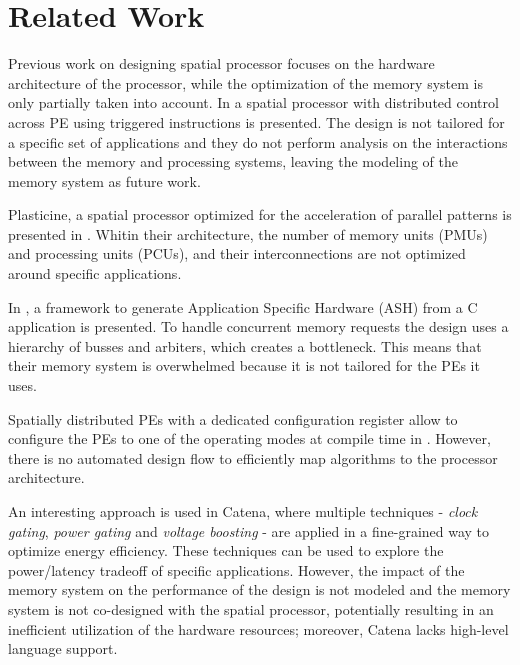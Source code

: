 
\section{Related Work}

Previous work on designing spatial processor focuses on the hardware architecture of the processor, while the optimization of the memory system is only partially taken into account.
In \cite{parashar2014efficient} a spatial processor with distributed control across PE using triggered instructions is presented. The design is not tailored for a specific set of applications and they do not perform analysis on the interactions between the memory and processing systems, leaving the modeling of the memory system as future work.

Plasticine, a spatial processor optimized for the acceleration of parallel patterns is presented in \cite{prabhakar2017plasticine}. Whitin their architecture, the number of memory units (PMUs) and processing units (PCUs), and their interconnections are not optimized around specific applications.

In \cite{budiu2004spatial}, a framework to generate Application Specific Hardware (ASH) from a C application is presented. To handle concurrent memory requests the design uses a hierarchy of busses and arbiters, which creates a bottleneck. This means that their memory system is overwhelmed because it is not tailored for the PEs it uses.

Spatially distributed PEs with a dedicated configuration register allow to configure the PEs to one of the operating modes at compile time in \cite{streamproc2019} . However, there is no automated design flow to efficiently map algorithms to the processor architecture.

An interesting approach is used in Catena\cite{cerqueira2020catena}, where multiple techniques - \textit{clock gating}, \textit{power gating} and \textit{voltage boosting} - are applied in a fine-grained way to optimize energy efficiency. These techniques can be used to explore the power/latency tradeoff of specific applications. However, the impact of the memory system on the performance of the design is not modeled and the memory system is not co-designed with the spatial processor, potentially resulting in an inefficient utilization of the hardware resources; moreover, Catena lacks high-level language support.

